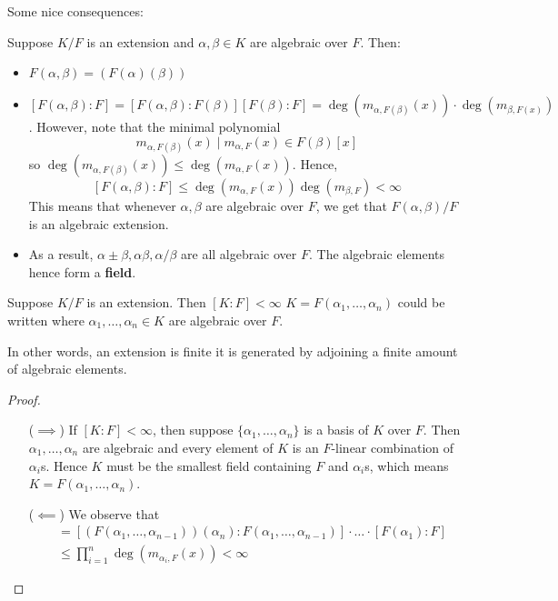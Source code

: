 \documentclass[12pt]{article}
\begin{document}
Some nice consequences:
\begin{corollary}
    Suppose $K/F$ is an extension and $\alpha,\beta\in K$ are algebraic over $F$. Then:
    \begin{itemize}
        \item $F(\alpha,\beta)=(F(\alpha)(\beta))$
        \item $[F(\alpha,\beta):F]=[F(\alpha,\beta):F(\beta)][F(\beta):F]=\deg\left(m_{\alpha,F(\beta)}(x)\right)\cdot \deg\left(m_{\beta,F(x)}\right)$. However, note that the minimal polynomial $$m_{\alpha,F(\beta)}(x)\mid m_{\alpha,F}(x)\in F(\beta)[x]$$
        so $\deg(m_{\alpha,F(\beta)}(x))\leq \deg(m_{\alpha,F}(x))$. Hence, $$[F(\alpha,\beta):F]\leq \deg(m_{\alpha,F}(x))\deg(m_{\beta,F})<\infty$$
        This means that whenever $\alpha, \beta$ are algebraic over $F$, we get that $F(\alpha,\beta)/F$ is an algebraic extension.
        \item As a result, $\alpha\pm\beta, \alpha\beta, \alpha/\beta$ are all algebraic over $F$. The algebraic elements hence form a \textbf{field}.
    \end{itemize}
\end{corollary}

\begin{proposition}
    Suppose $K/F$ is an extension. Then $[K:F]< \infty$ \ifnif $K=F(\alpha_1,\dots,\alpha_n)$ could be written where $\alpha_1,\dots,\alpha_n\in K$ are algebraic over $F$. 
    
    In other words, an extension is finite \ifnif it is generated by adjoining a finite amount of algebraic elements.
\end{proposition}
\begin{proof}\hfill
    \begin{itemize}[align=left]
        \item[($\implies$)] If $[K:F]< \infty$, then suppose $\{\alpha_1,\dots,\alpha_n\}$ is a basis of $K$ over $F$. Then $\alpha_1,\dots,\alpha_n$ are algebraic and every element of $K$ is an $F$-linear combination of $\alpha_i$s. Hence $K$ must be the smallest field containing $F$ and $\alpha_i$s, which means $K=F(\alpha_1,\dots,\alpha_n)$.
        \item[($\impliedby$)] We observe that \begin{align*}
            [K:F] &= [(F(\alpha_1,\dots,\alpha_{n-1}))(\alpha_n):F(\alpha_1,\dots,\alpha_{n-1})]\cdot \ldots\cdot [F(\alpha_1):F]\\
            &\leq \prod_{i=1}^{n}\deg(m_{\alpha_i,F}(x))<\infty
        \end{align*}
    \end{itemize}
\end{proof}
\end{document}
